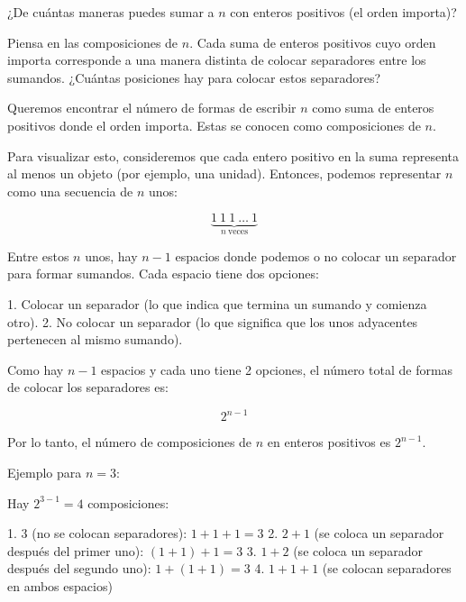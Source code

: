 \documentclass[11pt]{scrartcl}
\begin{document}
\begin{problem}
¿De cuántas maneras puedes sumar a $n$ con enteros positivos (el orden importa)?
\begin{hint}
Piensa en las composiciones de $n$. Cada suma de enteros positivos cuyo orden importa corresponde a una manera distinta de colocar separadores entre los sumandos. ¿Cuántas posiciones hay para colocar estos separadores?

\begin{solu}

Queremos encontrar el número de formas de escribir $n$ como suma de enteros positivos donde el orden importa. Estas se conocen como composiciones de $n$.

Para visualizar esto, consideremos que cada entero positivo en la suma representa al menos un objeto (por ejemplo, una unidad). Entonces, podemos representar $n$ como una secuencia de $n$ unos:

$$
\underbrace{1\ 1\ 1\ \dots\ 1}_{n\ \text{veces}}
$$

Entre estos $n$ unos, hay $n - 1$ espacios donde podemos o no colocar un separador para formar sumandos. Cada espacio tiene dos opciones:

1. Colocar un separador (lo que indica que termina un sumando y comienza otro).
2. No colocar un separador (lo que significa que los unos adyacentes pertenecen al mismo sumando).

Como hay $n - 1$ espacios y cada uno tiene 2 opciones, el número total de formas de colocar los separadores es:

$$
2^{n - 1}
$$

Por lo tanto, el número de composiciones de $n$ en enteros positivos es $2^{n - 1}$.

Ejemplo para $n = 3$:

Hay $2^{3 - 1} = 4$ composiciones:

1. $3$ (no se colocan separadores): $1 + 1 + 1 = 3$
2. $2 + 1$ (se coloca un separador después del primer uno): $(1 + 1) + 1 = 3$
3. $1 + 2$ (se coloca un separador después del segundo uno): $1 + (1 + 1) = 3$
4. $1 + 1 + 1$ (se colocan separadores en ambos espacios)

\end{solu}
\end{hint}

\end{problem}
\end{document}
